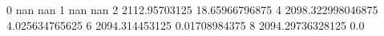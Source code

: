 0 nan nan
1 nan nan
2 2112.95703125 18.65966796875
4 2098.322998046875 4.025634765625
6 2094.314453125 0.01708984375
8 2094.29736328125 0.0
